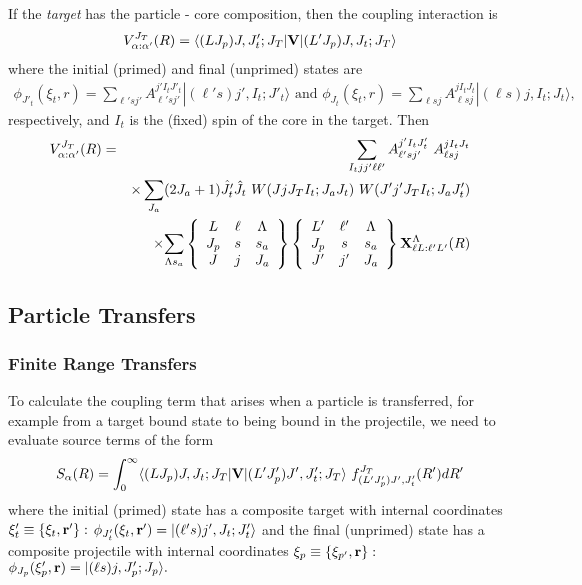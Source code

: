 \documentclass[11pt,a4paper]{article}
\newcommand{\vecr}{{\bf r}}
\begin{document}
If the {\em target} has the particle - core composition, then the
coupling interaction is
\begin{eqnarray}
 V^{J_T}_{\alpha :\alpha'} (R) =
\langle(L       J_p)J, J'_ t ;J_T | {\bf V} |
   (L' J_p)J, J    _t ;J_T\rangle
\end{eqnarray}
where the initial (primed) and final (unprimed) states are
\begin{eqnarray}
   \phi_{J'_ t} (\xi_t , r) =
    \sum_{\ell' sj'}
      A_{\ell ' sj'}^{j' I_t J'_ t}
      | ( \ell' s) j' , I_t ; J'_ t\rangle
    \mbox{  and }
   \phi_{J_t} (\xi_t , r) =
    \sum_{\ell sj}
      A_{\ell  sj}^{jI_t J_t}
    | ( \ell s) j , I_t ; J_t\rangle ,
\end{eqnarray}
respectively, and $I_t$ is the (fixed) spin of the core in the target.
Then
\begin{eqnarray}
 V^{J_T}_{\alpha :\alpha'} (R)
   &=&
 \sum_{I_t j j' \ell \ell'}
  A_{\ell ' sj'}^{j' I_t J'_ t} ~
  A_{\ell  sj}^{jI_t J_t}
\nonumber
\\
&& \times \sum_{J_a}
    (2J_a + 1) \hat{J'_ t} \hat {J_t}        ~
     W(J j J_T I_t ; J_a J_t) ~
     W(J' j' J_T I_t ; J_a J'_ t)
\nonumber
\\
&& \times {\sum_{\Lambda s_a } }
    \left \{ \begin{array}{ccc} L&\ell&\Lambda\\J_p&s&s_a\\J&j&J_a\end{array}\right \}
    \left \{ \begin{array}{ccc} L'&\ell'&\Lambda\\J_p&s&s_a\\J'&j'&J_a\end{array}\right \}
  {\bf X}^\Lambda_{\ell L: \ell' L'} (R)
\end{eqnarray}
\subsection{Particle Transfers}
\subsubsection{Finite Range Transfers}
\label{EFR}

To calculate the coupling term that arises when a particle is transferred,
for example from a target bound state to being bound in the projectile,
we need to evaluate source terms of the form
\begin{eqnarray}
    S_\alpha (R) = \int_ 0 ^ \infty
\langle (LJ_p)J,J_t ;J_T | {\bf V} |
   (L' J'_ p)J' ,J'_ t ;J_T\rangle ~
   f^{J_T}
    _{ (L' J'_ p)J' ,J'_ t} (R' ) dR'
\end{eqnarray}
where the initial (primed) state has a composite target
with internal coordinates
$ \xi'_ t \equiv \{ \xi_t , \vecr' \}: $
$
 \phi_{J'_ t} (\xi_t , \vecr' ) =
    | ( \ell' s) j' , J_t ; J'_ t\rangle
$
and the final (unprimed) state has a composite projectile
with internal coordinates
$ \xi_p \equiv \{ \xi_{p'} , \vecr \}: $
$
   \phi_{J_p} (\xi'_ p , \vecr) =
    | ( \ell s) j , J'_ p ; J_p\rangle .
$
\end{document}
